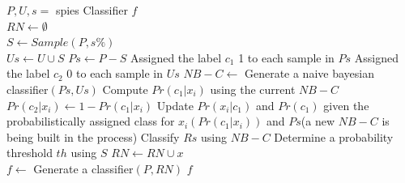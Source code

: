 \documentclass{article}
\begin{document}
\begin{algorithm}[!h]
\renewcommand{\algorithmicrequire}{\textbf{Input:}} %
\renewcommand{\algorithmicensure}{\textbf{Output:}} %
	\caption{Spy-EM} %
	\begin{algorithmic}[1] %
	    \REQUIRE
	    $P,U,s=$ spies
	    \ENSURE
	    Classifier $f$ \\
		\STATE $RN\leftarrow \emptyset$ \\
		\STATE $S\leftarrow Sample(P,s\%)$ \\
		\STATE $Us\leftarrow U\cup S$
		\STATE $Ps\leftarrow P-S$
		\STATE Assigned the label $c_1$ 1 to each sample in $Ps$
		\STATE Assigned the label $c_2$ 0 to each sample in $Us$
		\STATE $NB-C\leftarrow$ Generate a naive bayesian classifier$(Ps,Us)$
		\STATE Compute $Pr(c_1|x_i)$ using the current $NB-C$
		\STATE $Pr(c_2|x_i)\leftarrow 1-Pr(c_1|x_i)$
		\STATE Update $Pr(x_i|c_1)$ and $Pr(c_1)$ given the probabilistically assigned class for $x_i(Pr(c_1|x_i))$ and $Ps$(a new $NB-C$ is being built in the process)   
		\ENDFOR
		\ENDWHILE
		\STATE Classify $Rs$ using $NB-C$
		\STATE Determine a probability threshold $th$ using $S$
		\STATE $RN\leftarrow RN\cup x$ \\
		\ENDIF
        \ENDFOR
        \STATE $f\leftarrow$ Generate a classifier$(P,RN)$
		\RETURN $f$
	\end{algorithmic}
\end{algorithm}
\end{document}
